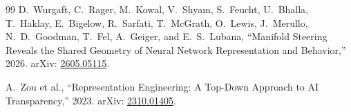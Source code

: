 \documentclass[11pt,a4paper]{article}
\theoremstyle{definition}
\begin{document}
\begin{thebibliography}{99}
D.~Wurgaft, C.~Rager, M.~Kowal, V.~Shyam, S.~Feucht, U.~Bhalla, T.~Haklay, E.~Bigelow, R.~Sarfati, T.~McGrath, O.~Lewis, J.~Merullo, N.~D.~Goodman, T.~Fel, A.~Geiger, and E.~S.~Lubana,
``Manifold Steering Reveals the Shared Geometry of Neural Network Representation and Behavior,'' 2026.
arXiv: \href{https://arxiv.org/abs/2605.05115}{2605.05115}.

A.~Zou et al.,
``Representation Engineering: A Top-Down Approach to AI Transparency,'' 2023.
arXiv: \href{https://arxiv.org/abs/2310.01405}{2310.01405}.

\end{thebibliography}
\end{document}
